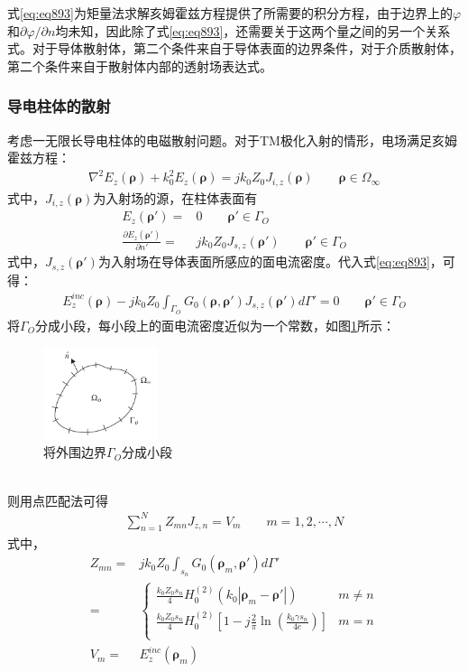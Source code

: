 \documentclass{article}
\numberwithin{equation}{section}
\renewcommand{\vec}[1]{\boldsymbol{#1}}
\begin{document}
式\ref{eq:eq893}为矩量法求解亥姆霍兹方程提供了所需要的积分方程，由于边界上的$\varphi$和$\partial\varphi/\partial n$均未知，因此除了式\ref{eq:eq893}，还需要关于这两个量之间的另一个关系式。对于导体散射体，第二个条件来自于导体表面的边界条件，对于介质散射体，第二个条件来自于散射体内部的透射场表达式。
\subsubsection{导电柱体的散射}
考虑一无限长导电柱体的电磁散射问题。对于TM极化入射的情形，电场满足亥姆霍兹方程：
\begin{align}
    \label{eq:eq894}
    \nabla^2E_z(\vec{\rho})+k^2_0E_z(\vec{\rho})=jk_0Z_0J_{i,z}(\vec{\rho})\qquad\vec{\rho}\in\Omega_{\infty}
\end{align}
式中，$J_{i,z}(\vec{\rho})$为入射场的源，在柱体表面有
\begin{align}
    \label{eq:eq895}
    E_z(\vec{\rho}')=&0\qquad\vec{\rho}'\in\Gamma_O \\
    \label{eq:eq896}
    \frac{\partial E_z(\vec{\rho}')}{\partial n'}=&jk_0Z_0J_{s,z}(\vec{\rho}')\qquad\vec{\rho}'\in\Gamma_O
\end{align}
式中，$J_{s,z}(\vec{\rho}')$为入射场在导体表面所感应的面电流密度。代入式\ref{eq:eq893}，可得\textbf{\color{blue}{电场积分方程(EFIE)}}：
\begin{align}
    \label{eq:eq897}
    E_z^{inc}(\vec{\rho})-jk_0Z_0\int_{\Gamma_O}G_0(\vec{\rho},\vec{\rho}')J_{s,z}(\vec{\rho}')d\Gamma'=0\qquad\vec{\rho}'\in\Gamma_O
\end{align}
将$\Gamma_O$分成小段，每小段上的面电流密度近似为一个常数，如图\ref{fig:fig65}所示：
\begin{figure}[ht]
    \centering
    \includegraphics[width=0.3\textwidth]{将外围边界Gamma_O分成小段.PNG}
    \caption{将外围边界$\Gamma_O$分成小段}
    \label{fig:fig65}
\end{figure}
\\
则用点匹配法可得
\begin{align}
    \label{eq:eq898}
    \sum_{n=1}^{N}Z_{mn}J_{z,n}=V_m\qquad m=1,2,\cdots,N
\end{align}
式中，
\begin{align}
    \label{eq:eq899}
    Z_{mn}=&jk_0Z_0\int_{s_n}G_0(\vec{\rho}_m,\vec{\rho}')d\Gamma' \nonumber \\
          =&\left\{
        \begin{matrix}
            \frac{k_0Z_0s_n}{4}H_0^{(2)}(k_0|\vec{\rho}_m-\vec{\rho}'|) & m\neq n \\
            \frac{k_0Z_0s_n}{4}H_0^{(2)}\left[1-j\frac{2}{\pi}\ln\left(\frac{k_0\gamma s_n}{4e}\right)\right] & m=n \\
        \end{matrix}
    \right. \\
    \label{eq:eq900}
    V_m=&E^{inc}_z(\vec{\rho}_m)
\end{align}
\end{document}
